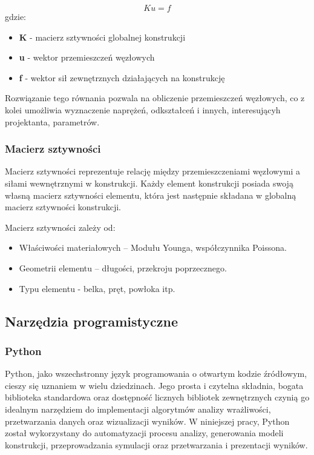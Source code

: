 \begin{equation}
    Ku = f
\end{equation}
gdzie:

\begin{itemize}
    \item \textbf{K} - macierz sztywności globalnej konstrukcji
    \item \textbf{u} - wektor przemieszczeń węzłowych
    \item \textbf{f} - wektor sił zewnętrznych działających na konstrukcję
\end{itemize}

Rozwiązanie tego równania pozwala na obliczenie przemieszczeń węzłowych, co z kolei umożliwia wyznaczenie naprężeń, odkształceń i innych, interesującyh projektanta, parametrów.

\subsubsection{Macierz sztywności}

Macierz sztywności reprezentuje relację między przemieszczeniami węzłowymi a siłami wewnętrznymi w konstrukcji.
Każdy element konstrukcji posiada swoją własną macierz sztywności elementu, która jest następnie składana w globalną macierz sztywności konstrukcji.

Macierz sztywności zależy od:

\begin{itemize}
    \item Właściwości materiałowych – Modułu Younga, współczynnika Poissona.
    \item Geometrii elementu – długości, przekroju poprzecznego.
    \item Typu elementu - belka, pręt, powłoka itp.
\end{itemize}

\subsection{Narzędzia programistyczne}
\subsubsection{Python}

Python, jako wszechstronny język programowania o otwartym kodzie źródłowym, cieszy się uznaniem w wielu dziedzinach\cite{python}.
Jego prosta i czytelna składnia, bogata biblioteka standardowa oraz dostępność licznych bibliotek zewnętrznych czynią go idealnym narzędziem do implementacji algorytmów analizy wrażliwości, przetwarzania danych oraz wizualizacji wyników.
W niniejszej pracy, Python został wykorzystany do automatyzacji procesu analizy, generowania modeli konstrukcji, przeprowadzania symulacji oraz przetwarzania i prezentacji wyników.

